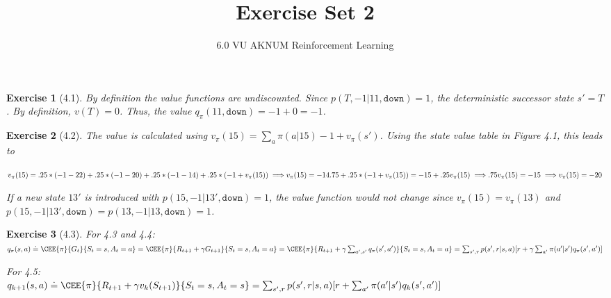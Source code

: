 \documentclass[a4paper]{scrartcl}
\title{Exercise Set 2}
\subtitle{6.0 VU AKNUM Reinforcement Learning}
\author{}
\theoremstyle{nonumberplain}
\newtheorem{ex}{Exercise}
\begin{document}
\maketitle



\begin{ex}[4.1]
By definition the value functions are undiscounted. Since $p(T,-1 | 11,\texttt{down})=1$, the deterministic successor state $s'=T$. By definition, $v(T)=0$. Thus, the value $q_\pi(11,\texttt{down})=-1+0=-1$.
\end{ex}

\begin{ex}[4.2]
The value is calculated using $v_\pi(15)=\sum_{a}\pi(a|15) -1 + v_\pi(s')$. Using the state value table in Figure 4.1, this leads to

\begin{math}
v_\pi(15)=.25 * (-1 - 22) + .25 * (-1 - 20) + .25 * (-1 - 14) + .25 * (-1 + v_\pi(15))\implies\\
v_\pi(15)=-14.75 + .25 * (-1 + v_\pi(15))=-15+.25v_\pi(15)\implies\\
.75v_\pi(15)=-15\implies\\
v_\pi(15)=-20
\end{math}

If a new state $13'$ is introduced with $p(15,-1 | 13',\texttt{down})=1$, the value function would not change since $v_\pi(15)=v_\pi(13)$ and $p(15,-1 | 13',\texttt{down})=p(13,-1 | 13,\texttt{down})=1$.

\end{ex}

\begin{ex}[4.3]
For 4.3 and 4.4:\\
\begin{math}
q_\pi(s,a)\doteq\CEE{\pi}{G_t}{S_t=s, A_t=a}\\
=\CEE{\pi}{R_{t+1} + \gamma G_{t+1}}{S_t=s, A_t=a}\\
=\CEE{\pi}{R_{t+1} + \gamma \sum_{a',s'} q_\pi(s',a')}{S_t=s, A_t=a}\\
=\sum_{s',r}p(s',r|s,a)[r+\gamma\sum_{a'} \pi(a'|s') q_\pi(s',a')]
\end{math}

For 4.5:\\
\begin{math}
q_{k+1}(s,a)\doteq\CEE{\pi}{R_{t+1}+\gamma v_k(S_{t+1})}{S_t=s, A_t=s}\\
=\sum_{s',r}p(s',r|s,a)[r+\sum_{a'}\pi(a'|s')q_k(s',a')]
\end{math}

\end{ex}
\end{document}
